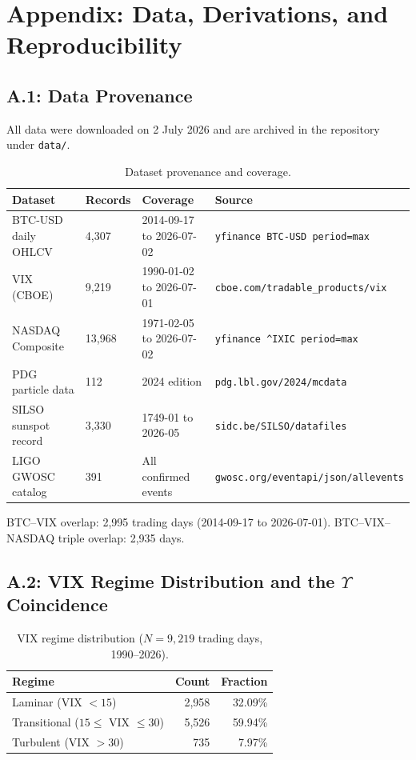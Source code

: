 \section*{Appendix: Data, Derivations, and Reproducibility}

\subsection*{A.1: Data Provenance}

All data were downloaded on 2 July 2026 and are archived in the repository under \texttt{data/}.

\begin{table}[ht]
\centering\small
\caption{Dataset provenance and coverage.}
\label{tab:data_provenance}
\begin{tabular}{@{}llll@{}}
\toprule
\textbf{Dataset} & \textbf{Records} & \textbf{Coverage} & \textbf{Source} \\
\midrule
BTC-USD daily OHLCV & 4{,}307 & 2014-09-17 to 2026-07-02 & \texttt{yfinance BTC-USD period=max} \\
VIX (CBOE) & 9{,}219 & 1990-01-02 to 2026-07-01 & \texttt{cboe.com/tradable\_products/vix} \\
NASDAQ Composite & 13{,}968 & 1971-02-05 to 2026-07-02 & \texttt{yfinance \^{}IXIC period=max} \\
PDG particle data & 112 & 2024 edition & \texttt{pdg.lbl.gov/2024/mcdata} \\
SILSO sunspot record & 3{,}330 & 1749-01 to 2026-05 & \texttt{sidc.be/SILSO/datafiles} \\
LIGO GWOSC catalog & 391 & All confirmed events & \texttt{gwosc.org/eventapi/json/allevents} \\
\bottomrule
\end{tabular}
\end{table}

BTC--VIX overlap: 2{,}995 trading days (2014-09-17 to 2026-07-01). BTC--VIX--NASDAQ triple overlap: 2{,}935 days.

\subsection*{A.2: VIX Regime Distribution and the $\Upsilon$ Coincidence}

\begin{table}[ht]
\centering\small
\caption{VIX regime distribution ($N = 9{,}219$ trading days, 1990--2026).}
\label{tab:vix_regimes}
\begin{tabular}{@{}lrr@{}}
\toprule
\textbf{Regime} & \textbf{Count} & \textbf{Fraction} \\
\midrule
Laminar (VIX $< 15$) & 2{,}958 & 32.09\% \\
Transitional ($15 \leq$ VIX $\leq 30$) & 5{,}526 & 59.94\% \\
Turbulent (VIX $> 30$) & 735 & 7.97\% \\
\bottomrule
\end{tabular}
\end{table}

